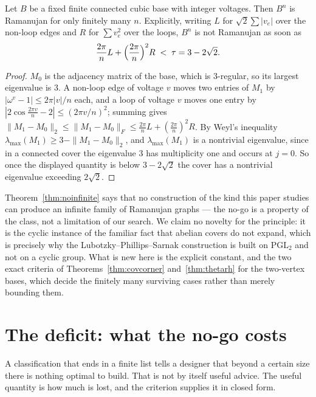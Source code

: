 \begin{theorem}\label{thm:noinfinite}
Let $B$ be a fixed finite connected cubic base with integer voltages. Then
$B^{n}$ is Ramanujan for only finitely many $n$. Explicitly, writing $L$ for
$\sqrt2\sum|v_e|$ over the non-loop edges and $R$ for $\sum v_e^{2}$ over the
loops, $B^{n}$ is not Ramanujan as soon as
\[
  \frac{2\pi}{n}L+\Bigl(\frac{2\pi}{n}\Bigr)^{2}R\;<\;\tau=3-2\sqrt2 .
\]
\end{theorem}

\begin{proof}
$M_0$ is the adjacency matrix of the base, which is $3$-regular, so its largest
eigenvalue is $3$. A non-loop edge of voltage $v$ moves two entries of $M_1$ by
$|\omega^{v}-1|\le2\pi|v|/n$ each, and a loop of voltage $v$ moves one entry by
$|2\cos\frac{2\pi v}{n}-2|\le(2\pi v/n)^{2}$; summing gives
$\|M_1-M_0\|_2\le\|M_1-M_0\|_F\le\frac{2\pi}{n}L+(\frac{2\pi}{n})^{2}R$. By
Weyl's inequality $\lambda_{\max}(M_1)\ge3-\|M_1-M_0\|_2$, and $\lambda_{\max}(M_1)$
is a nontrivial eigenvalue, since in a connected cover the eigenvalue $3$ has
multiplicity one and occurs at $j=0$. So once the displayed quantity is below
$3-2\sqrt2$ the cover has a nontrivial eigenvalue exceeding $2\sqrt2$.
\end{proof}

\begin{remark}
Theorem~\ref{thm:noinfinite} says that no construction of the kind this paper
studies can produce an infinite family of Ramanujan graphs --- the no-go is a
property of the class, not a limitation of our search. We claim no novelty for
the principle: it is the cyclic instance of the familiar fact that abelian
covers do not expand, which is precisely why the Lubotzky--Phillips--Sarnak
construction \cite{lps} is built on $\mathrm{PGL}_2$ and not on a cyclic group.
What is new here is the explicit constant, and the two exact criteria of
Theorems~\ref{thm:covcorner} and~\ref{thm:thetarh} for the two-vertex bases,
which decide the finitely many surviving cases rather than merely bounding
them.
\end{remark}

\section{The deficit: what the no-go costs}\label{sec:deficit}

A classification that ends in a finite list tells a designer that beyond a
certain size there is nothing optimal to build. That is not by itself useful
advice. The useful quantity is how much is lost, and the criterion supplies it
in closed form.

